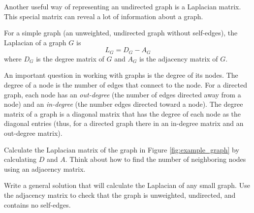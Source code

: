 Another useful way of representing an undirected graph is a Laplacian matrix.
This special matrix can reveal a lot of information about a graph.
\begin{definition}
For a simple graph (an unweighted, undirected graph without self-edges), the Laplacian of a graph $G$ is
\[ L_G = D_G - A_G \]
where $D_G$ is the degree matrix of $G$ and $A_G$ is the adjacency matrix of $G$.
\end{definition}
An important question in working with graphs is the degree of its nodes.
The degree of a node is the number of edges that connect to the node.
For a directed graph, each node has an \emph{out-degree} (the number of edges directed away from a node) and an \emph{in-degree} (the number edges directed toward a node).
The degree matrix of a graph is a diagonal matrix that has the degree of each node as the diagonal entries (thus, for a directed graph there in an in-degree matrix and an out-degree matrix).

\begin{problem}
Calculate the Laplacian matrix of the graph in Figure \ref{fig:example_graph} by calculating $D$ and $A$.
Think about how to find the number of neighboring nodes using an adjacency matrix.

Write a general solution that will calculate the Laplacian of any small graph.
Use the adjacency matrix to check that the graph is unweighted, undirected, and contains no self-edges.
\label{prob:laplacian}
\end{problem}
